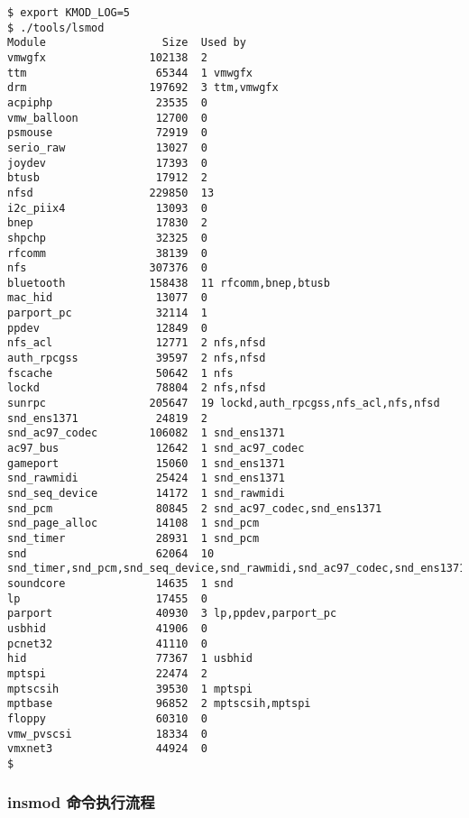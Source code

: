 \documentclass[11pt,a4paper]{article}
\begin{document}
{\begin{shaded}\begin{verbatim}
$ export KMOD_LOG=5
$ ./tools/lsmod 
Module                  Size  Used by
vmwgfx                102138  2 
ttm                    65344  1 vmwgfx
drm                   197692  3 ttm,vmwgfx
acpiphp                23535  0 
vmw_balloon            12700  0 
psmouse                72919  0 
serio_raw              13027  0 
joydev                 17393  0 
btusb                  17912  2 
nfsd                  229850  13 
i2c_piix4              13093  0 
bnep                   17830  2 
shpchp                 32325  0 
rfcomm                 38139  0 
nfs                   307376  0 
bluetooth             158438  11 rfcomm,bnep,btusb
mac_hid                13077  0 
parport_pc             32114  1 
ppdev                  12849  0 
nfs_acl                12771  2 nfs,nfsd
auth_rpcgss            39597  2 nfs,nfsd
fscache                50642  1 nfs
lockd                  78804  2 nfs,nfsd
sunrpc                205647  19 lockd,auth_rpcgss,nfs_acl,nfs,nfsd
snd_ens1371            24819  2 
snd_ac97_codec        106082  1 snd_ens1371
ac97_bus               12642  1 snd_ac97_codec
gameport               15060  1 snd_ens1371
snd_rawmidi            25424  1 snd_ens1371
snd_seq_device         14172  1 snd_rawmidi
snd_pcm                80845  2 snd_ac97_codec,snd_ens1371
snd_page_alloc         14108  1 snd_pcm
snd_timer              28931  1 snd_pcm
snd                    62064  10 snd_timer,snd_pcm,snd_seq_device,snd_rawmidi,snd_ac97_codec,snd_ens1371
soundcore              14635  1 snd
lp                     17455  0 
parport                40930  3 lp,ppdev,parport_pc
usbhid                 41906  0 
pcnet32                41110  0 
hid                    77367  1 usbhid
mptspi                 22474  2 
mptscsih               39530  1 mptspi
mptbase                96852  2 mptscsih,mptspi
floppy                 60310  0 
vmw_pvscsi             18334  0 
vmxnet3                44924  0 
$ 
\end{verbatim}\end{shaded}}
\subsubsection{insmod 命令执行流程}
\end{document}

